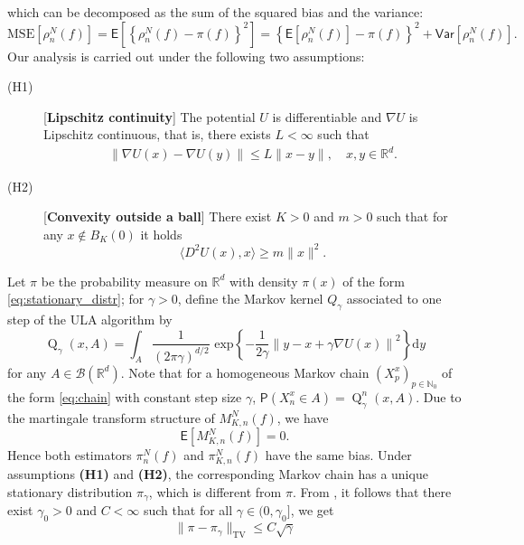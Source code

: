 \documentclass[bj]{imsart}
\def\PE{\mathsf{E}}
\def\PVar{\mathsf{Var}}
\newcommand{\ps}[2]{\langle #1, #2 \rangle}
\def\nset{\mathbb{N}}
\def\rset{\mathbb{R}}
\def\rmd{\mathrm{d}}
\def\rset{\mathbb{R}}
\newcommand{\tvnorm}[1]{\| #1 \|_{\operatorname{TV}}}
\def\kerULA{\operatorname{Q}}
\begin{document}
which can be decomposed as the sum of the squared  bias
and the  variance:
\begin{equation}
\label{eq:29032018a4}
\mathrm{MSE}\left[\rho_n^N(f)\right] = \PE\left[\left\{\rho_n^N(f)-\pi(f)\right\}^2\right]
=\left\{\PE[\rho_n^N(f)]-\pi(f)\right\}^2 +\PVar[\rho_n^N(f)].
\end{equation}
Our analysis is carried out under the following two assumptions:
\begin{description}
\item[(H1)][\textbf{Lipschitz continuity}] The potential $U$ is differentiable and $\nabla U$ is Lipschitz continuous, that is, there exists $L < \infty$ such that
\begin{eqnarray*}
\| \nabla U(x)-\nabla U(y) \| \leq L \|x-y\|, \quad x,y\in \rset^d.
\end{eqnarray*}
\item[(H2)][\textbf{Convexity outside a ball}] There exist $K>0$ and $m>0$ such that for any $x\not\in B_{K}(0)$  it holds
\begin{equation*}
\ps{D^2U(x)}{x} \geq m\|x\|^2.
\end{equation*}
\end{description}
Let $\pi$ be the probability measure on $\rset^d$ with density $\pi(x)$ of the form \eqref{eq:stationary_distr};
for $\gamma>0$, define the Markov kernel $Q_\gamma$ associated to one step of the ULA algorithm by
\begin{equation}
\label{eq:ula_kernel}
\kerULA_{\gamma}(x,A)=\int_{A} \frac{1}{(2 \pi \gamma)^{d/2}} \text{ exp} \left\{ -\frac{1}{2\gamma} \left\| y - x + \gamma \nabla U(x)\right\|^2\right\} \rmd y
\end{equation}
for any $A \in \mathcal{B}(\rset^d)$. Note that for a homogeneous Markov chain $\left(X^x_{p}\right)_{p \in \nset_0}$ of the form \eqref{eq:chain} with constant step size $\gamma$, $\mathsf{P}(X_n^x \in A) = \kerULA^n_{\gamma}(x,A)$.
Due to the martingale transform structure
of $M_{K,n}^N(f)$,
we have
\[
\mathsf E\left[M_{K,n}^N(f)\right]=0.
\]
Hence both estimators
$\pi_n^N(f)$ and $\pi_{K,n}^N(f)$ have the same  bias. Under assumptions {\bf (H1)} and {\bf (H2)}, the corresponding Markov chain has a unique stationary distribution $\pi_\gamma$, which is different from $\pi$. From \cite[Theorem~10]{durmus:moulines:2017},
it follows that there exist $\gamma_0 > 0$ and $C < \infty$ such that for all $\gamma \in (0,\gamma_0]$, we get
\begin{equation}
\label{eq:bias_2}
\tvnorm{\pi - \pi_\gamma} \leq  C\sqrt{\gamma}
\end{equation}
\end{document}
